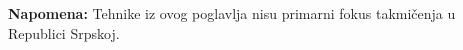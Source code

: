 
\textbf{Napomena:} Tehnike iz ovog poglavlja nisu primarni fokus takmičenja u Republici Srpskoj.




\newpage
